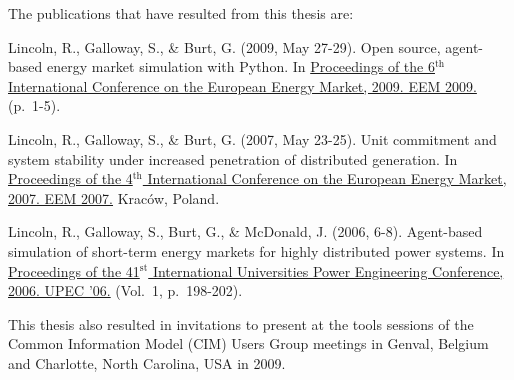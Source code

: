 The publications that have resulted from this thesis are:

\vspace{1pc}
Lincoln, R., Galloway, S., \& Burt, G. (2009, May 27-29). Open source,
agent-based energy market simulation with Python. In \ul{Proceedings of
the 6$^{\textrm{th}}$ International Conference on the European Energy Market,
2009. EEM 2009.} (p.~1-5).

\vspace{1pc}
Lincoln, R., Galloway, S., \& Burt, G. (2007, May 23-25). Unit
commitment and system stability under increased penetration of distributed
generation. In \ul{Proceedings of the 4$^{\textrm{th}}$ International Conference
on the European Energy Market, 2007. EEM 2007.} Krac\'ow, Poland.

\vspace{1pc}
Lincoln, R., Galloway, S., Burt, G., \& McDonald, J. (2006, 6-8).
Agent-based simulation of short-term energy markets for highly distributed
power systems. In \ul{Proceedings of the 41$^{\textrm{st}}$ International
Universities Power Engineering Conference, 2006. UPEC '06.} (Vol.~1,
p.~198-202).

\vspace{1pc}
This thesis also resulted in invitations to present at the tools sessions of the
Common Information Model (CIM) Users Group meetings in Genval, Belgium and
Charlotte, North Carolina, USA in 2009.


